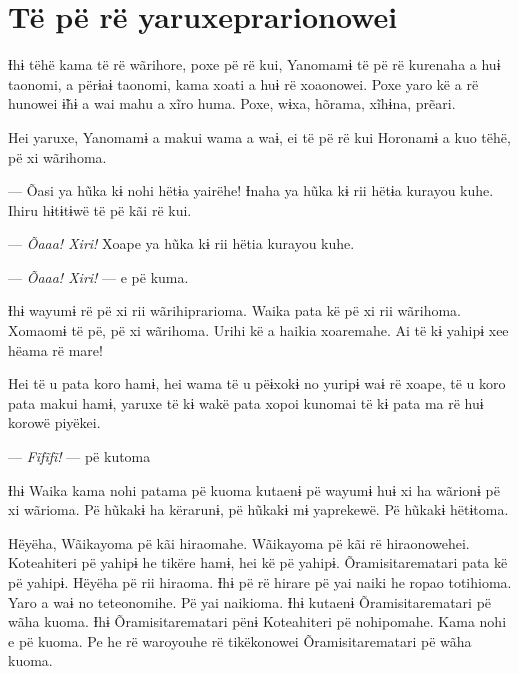 \chapter{Të pë rë yaruxeprarionowei}

  

Ɨhɨ tëhë kama të rë wãrihore, poxe pë rë kui, Yanomamɨ të pë rë kurenaha
a huɨ taonomi, a përɨaɨ taonomi, kama xoati a huɨ rë xoaonowei. Poxe
yaro kë a rë hunowei ɨ̃hɨ a wai mahu a xĩro huma. Poxe, wɨxa, hõrama,
xĩhɨna, prẽari. 


Hei yaruxe, Yanomamɨ a makui wama a waɨ, ei të pë rë kui Horonamɨ a kuo
tëhë, pë xi wãrihoma. 


--- Õasi ya hũka kɨ nohi hëtɨa yairëhe! Ɨnaha ya hũka kɨ rii hëtɨa
kurayou kuhe. Ihiru hɨtɨtɨwë të pë kãi rë kui. 

--- \textit{Õaaa! Xiri!} Xoape ya hũka kɨ rii hëtia kurayou kuhe. 

--- \textit{Õaaa! Xiri!} --- e pë kuma. 

Ɨhɨ wayumɨ rë pë xi rii wãrihiprarioma. Waika pata kë pë xi rii
wãrihoma. Xomaomɨ të pë, pë xi wãrihoma. Urihi kë a haikia xoaremahe. Ai
të kɨ yahipɨ xee hëama rë mare! 

Hei të u pata koro hamɨ, hei wama të u pëɨxokɨ no yuripɨ waɨ rë xoape,
të u koro pata makui hamɨ, yaruxe të kɨ wakë pata xopoi kunomai të kɨ
pata ma rë huɨ korowë piyëkei. 

--- \textit{Fĩfĩfĩ!} --- pë kutoma

Ɨhɨ Waika kama nohi patama pë kuoma kutaenɨ pë wayumɨ huɨ xi ha wãrionɨ
pë xi wãrioma. Pë hũkakɨ ha kërarunɨ, pë hũkakɨ mɨ yaprekewë. Pë hũkakɨ
hëtɨtoma.

Hëyëha, Wãikayoma pë kãi hiraomahe. Wãikayoma pë kãi rë hiraonowehei.
Koteahiteri pë yahipɨ he tikëre hamɨ, hei kë pë yahipɨ.
Õramisitarematari pata kë pë yahipɨ. Hëyëha pë rii hiraoma. Ɨhɨ pë rë
hirare pë yai naiki he ropao totihioma. Yaro a waɨ no teteonomihe. Pë
yai naikioma. Ɨhɨ kutaenɨ Õramisitarematari pë wãha kuoma. Ɨhɨ
Õramisitarematari pënɨ Koteahiteri pë nohipomahe. Kama nohi e pë kuoma.
Pe he rë waroyouhe rë tikëkonowei Õramisitarematari pë wãha kuoma. 

